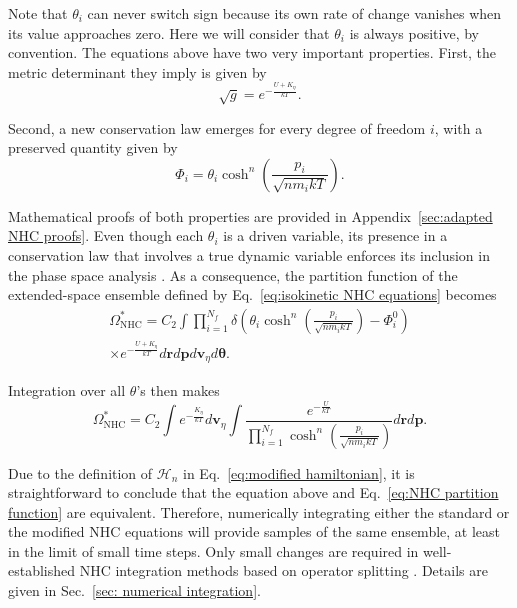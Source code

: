 \documentclass[
aip,
jcp,
reprint,
]{revtex4-1}
\newcommand{\vt}[1]{\boldsymbol{\mathbf{#1}}}          %
\newcommand{\nn}{n}
\begin{document}
Note that $\theta_i$ can never switch sign because its own rate of change vanishes when its value approaches zero.
Here we will consider that $\theta_i$ is always positive, by convention.
The equations above have two very important properties.
First, the metric determinant they imply is given by
\begin{equation}
\label{eq:isokinetic NHC metric determinant}
\sqrt{g} = e^{-\frac{U + K_\eta}{kT}}.
\end{equation}

Second, a new conservation law emerges for every degree of freedom $i$, with a preserved quantity given by
\begin{equation}
\label{eq:isokinetic NHC conserved quantity}
\Phi_i = \theta_i \cosh^\nn\left(\frac{p_i}{\sqrt{\nn m_i k T}}\right).
\end{equation}

Mathematical proofs of both properties are provided in Appendix~\ref{sec:adapted NHC proofs}.
Even though each $\theta_i$ is a driven variable, its presence in a conservation law that involves a true dynamic variable enforces its inclusion in the phase space analysis \cite{Tuckerman_2001}.
As a consequence, the partition function of the extended-space ensemble defined by Eq.~\eqref{eq:isokinetic NHC equations} becomes
\begin{multline*}
\label{eq:isokinetic NHC defined partition function}
\Omega_\mathrm{NHC}^\ast = C_2 \int \prod_{i=1}^{N_f}\delta\left(\theta_i \cosh^\nn\left(\tfrac{p_i}{\sqrt{\nn m_i k T}}\right) - \Phi_i^0\right) \\
\times  e^{-\frac{U + K_\eta}{kT}} d{\vt r} d{\vt p} d{\vt v}_\eta d{\vt \theta}.
\end{multline*}

Integration over all $\theta$'s then makes
\begin{equation*}
\label{eq:isokinetic NHC partition function}
\Omega_\mathrm{NHC}^\ast = C_2 \int e^{-\frac{K_\eta}{kT}} d{\vt v}_\eta \int \frac{e^{-\frac{U}{kT}}}{\prod_{i=1}^{N_f} \cosh^\nn\left(\tfrac{p_i}{\sqrt{\nn m_i k T}}\right)} d{\vt r} d{\vt p}.
\end{equation*}

Due to the definition of $\mathcal{H}_n$ in Eq.~\eqref{eq:modified hamiltonian}, it is straightforward to conclude that the equation above and Eq.~\eqref{eq:NHC partition function} are equivalent.
Therefore, numerically integrating either the standard or the modified NHC equations will provide samples of the same ensemble, at least in the limit of small time steps.
Only small changes are required in well-established NHC integration methods based on operator splitting \cite{Martyna_1996, Tuckerman_2010}.
Details are given in Sec.~\ref{sec: numerical integration}.
\end{document}

